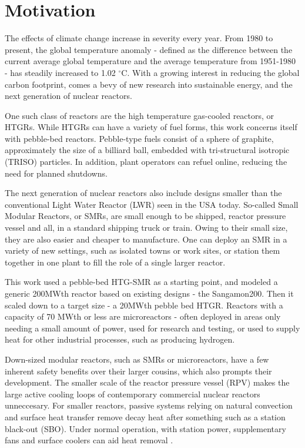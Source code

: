 \section{Motivation}

The effects of climate change increase in severity every year. From 1980 to present, the global temperature anomaly - defined as the difference between the current average global temperature and the average temperature from 1951-1980 - has steadily increased to 1.02 $^{\circ}$C.  With a growing interest in reducing the global carbon footprint, comes a bevy of new research into sustainable energy, and the next generation of nuclear reactors.

One such class of reactors are the high temperature gas-cooled reactors, or HTGRs.  While HTGRs can have a variety of fuel forms, this work concerns itself with pebble-bed reactors.  Pebble-type fuels consist of a sphere of graphite, approximately the size of a billiard ball, embedded with tri-structural isotropic (TRISO) particles.  In addition, plant operators can refuel online, reducing the need for planned shutdowns.

The next generation of nuclear reactors also include designs smaller than the conventional Light Water Reactor (LWR) seen in the USA today.  So-called Small Modular Reactors, or SMRs, are small enough to be shipped, reactor pressure vessel and all, in a standard shipping truck or train.  Owing to their small size, they are also easier and cheaper to manufacture.  One can deploy an SMR in a variety of new settings, such as isolated towns or work sites, or station them together in one plant to fill the role of a single larger reactor.

This work used a pebble-bed HTG-SMR as a starting point, and modeled a generic 200MWth reactor based on existing designs - the Sangamon200. Then it scaled down to a target size - a 20MWth pebble bed HTGR.  Reactors with a capacity of 70 MWth or less are microreactors - often deployed in areas only needing a small amount of power, used for research and testing, or used to supply heat for other industrial processes, such as producing hydrogen.

Down-sized modular reactors, such as SMRs or microreactors, have a few inherent safety benefits over their larger cousins, which also prompts their development.  The smaller scale of the reactor pressure vessel (RPV) makes the large active cooling loops of contemporary commercial nuclear reactors unneccesary.  For smaller reactors, passive systems relying on natural convection and surface heat transfer remove decay heat after something such as a station black-out (SBO).  Under normal operation, with station power, supplementary fans and surface coolers can aid heat removal \cite{reutler_advantages_1984}.

